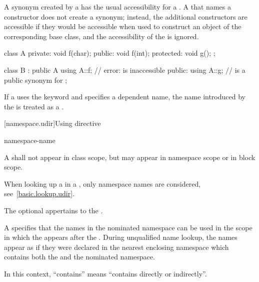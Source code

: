 \pnum
A synonym created by a  has the usual
accessibility for a .
A  that names a constructor does not
create a synonym; instead, the additional constructors
are accessible if they would be accessible
when used to construct an object of the corresponding base class,
and the accessibility of the  is ignored.
\begin{example}

\begin{codeblock}
class A {
private:
    void f(char);
public:
    void f(int);
protected:
    void g();
};

class B : public A {
  using A::f;       // error:  is inaccessible
public:
  using A::g;       //  is a public synonym for 
};
\end{codeblock}
\end{example}

\pnum
If a  uses the keyword  and
specifies a dependent name, the name introduced by the
 is treated as a
.%

[namespace.udir]{Using directive}%

\begin{bnf}
\br
       namespace-name \terminal{;}
\end{bnf}

\pnum
A  shall not appear in class scope, but may
appear in namespace scope or in block scope.
\begin{note}
When looking up a  in a
, only namespace names are considered,
see~\ref{basic.lookup.udir}.
\end{note}
The optional  appertains to the .

\pnum
A  specifies that the names in the nominated
namespace can be used in the scope in which the
 appears after the .
During unqualified name lookup, the names
appear as if they were declared in the nearest enclosing namespace which
contains both the  and the nominated
namespace.
\begin{note}
In this context, ``contains'' means ``contains directly or indirectly''.
\end{note}

